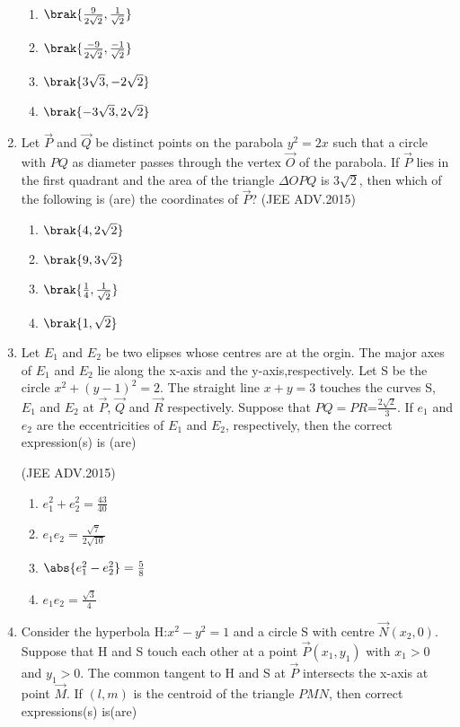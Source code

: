 \begin{enumerate}
		 \begin{enumerate}
			\item $\brak{\frac{9}{2\sqrt{2}},\frac{1}{\sqrt{2}}}$ 
			\item $ \brak{\frac{-9}{2\sqrt{2}},\frac{-1}{\sqrt{2}}}$
			\item $\brak{3\sqrt{3},-2\sqrt{2}}$
			\item $ \brak{-3\sqrt{3},2\sqrt{2}}$
		
		 \end{enumerate}

	\item Let $\vec{P}$ and $\vec{Q}$ be distinct points on the parabola $y^2=2x$ such 
		that a circle with $PQ$ as diameter passes through the vertex
		$\vec{O}$ of the parabola. If $\vec{P}$ lies in the first quadrant and the area
		of the triangle  \(\Delta \)$OPQ$ is 3$\sqrt{2}$, then which of the following is
		(are) the coordinates of $\vec{P}$?  
		\hfill(JEE ADV.2015)
		
		 \begin{enumerate}
			\item $ \brak{4,2\sqrt{2}}$
			\item $\brak{9,3\sqrt{2}}$
			\item $ \brak{\frac{1}{4},\frac{1}{\sqrt{2}}}$
			\item  $ \brak{1,\sqrt{2}}$
		 \end{enumerate}
	\item Let $ E_1$  and $ E_2$ be two elipses whose centres are at the orgin.
              The major axes of $E_1$ and $ E_2$ lie along the x-axis and the
              y-axis,respectively. Let S be the circle $x^2+(y-1)^2=2$. The
		straight line $x+y=3$ touches the curves S, $E_1$ and $E_2$ at $\vec{P}$, $\vec{Q}$
		and $\vec{R}$ respectively. Suppose that $PQ=PR$=$\frac{2\sqrt{2}}{3}$. If $e_1$ and
              $e_2$ are the eccentricities of $E_1$ and $E_2$, respectively, then the 
              correct expression(s) is (are) 
	        
		\hfill(JEE ADV.2015)
		
		 \begin{enumerate}
			\item $e_1^2+e_2^2=\frac{43}{40}$
			\item $e_1e_2=\frac{\sqrt{7}}{2\sqrt{10}}$
			\item $\abs{ e_1^2-e_2^2}=\frac{5}{8}$
			\item $e_1e_2=\frac{\sqrt{3}}{4}$ 
		 \end{enumerate}
	\item Consider the hyperbola H:$x^2-y^2=1$ and a circle S with 
		centre $\vec{N}(x_2,0)$. Suppose that H and S touch each other at a 
	      point $\vec{P}(x_1,y_1)$ with $x_1>0$ and $y_1>0$. The common tangent to H and S at $\vec{P}$ intersects the x-axis at point $\vec{M}$. If $(l,m)$ is the centroid of the triangle $PMN$, then correct expressions(s) is(are)
	      

\end{enumerate}
